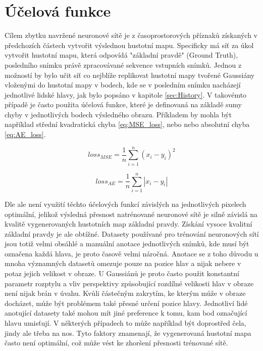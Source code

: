 \section{Účelová funkce}

Cílem zbytku navržené neuronové sítě je z časoprostorových příznaků získaných v předchozích částech vytvořit výslednou hustotní mapu.
Specificky má síť za úkol vytvořit hustotní mapu, která odpovídá "základní pravdě" (Ground Truth), posledního snímku právě zpracovávané sekvence vstupních snímků.
Jednou z možností by bylo učit síť co nejblíže replikovat hustotní mapy tvořené Gaussiány vloženými do hustotní mapy v bodech, kde se v posledním snímku nacházejí jednotlivé lidské hlavy, jak bylo popsáno v kapitole \ref{sec:History}.
V takovémto případě je často použita účelová funkce, které je definovaná na základě sumy chyby v jednotlivých bodech výsledného obrazu. Příkladem by mohla být například střední kvadratická chyba \ref{eq:MSE_loss}, nebo nebo absolutní chyba \ref{eq:AE_loss}.

\begin{equation}
loss_{MSE} = \frac{1}{n} \sum_{i=1}^{n} (x_i - y_i)^2
\label{eq:MSE_loss}
\end{equation}

\begin{equation}
loss_{AE} = \frac{1}{n} \sum_{i=1}^{n} |x_i - y_i|
\label{eq:AE_loss}
\end{equation}

Dle \cite{Bayesian_Crowd_Counting, DM_Count} ale není využití těchto účelových funkcí závislých na jednotlivých pixelech optimální, jelikož výsledná přesnost natrénované neuronové sítě je silně závislá na kvalitě vygenerovaných hustotních map základní pravdy.
Získání vysoce kvalitní základní pravdy je ale obtížné.
Datasety používané pro trénování neuronových sítí jsou totiž velmi obsáhlé a manuální anotace jednotlivých snímků, kde musí být označena každá hlava, je proto časově velmi náročná.
Anotace se z toho důvodu u mnoha významných datasetů omezuje pouze na pozice hlav a nijak nebere v potaz jejich velikost v obraze. U Gaussiánů je proto často použit konstantní parametr rozptylu a vliv perspektivy způsobující rozdílné velikosti hlav v obraze není nijak brán v úvahu.
Kvůli částečným zakrytím, ke kterým může v obraze docházet, může být problémem také přesné určení pozice hlavy.
Jednotliví lidé anotující datasety také mohou mít jiné preference k tomu, kam bod označující hlavu umisťují. V některých případech to může například být doprostřed čela, jindy ale třeba na nos.
Tyto faktory znamenají, že vygenerovaná hustotní mapa často není optimální, což může vést ke zhoršení přesnosti trénované sítě.

